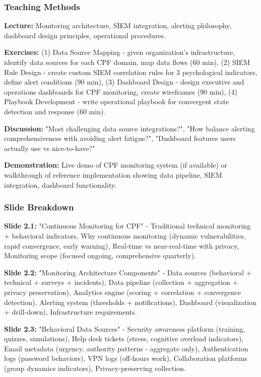 \documentclass[11pt,a4paper]{article}
\begin{document}
\subsubsection{Teaching Methods}

\textbf{Lecture:} Monitoring architecture, SIEM integration, alerting philosophy, dashboard design principles, operational procedures.

\textbf{Exercises:} (1) Data Source Mapping - given organization's infrastructure, identify data sources for each CPF domain, map data flows (60 min), (2) SIEM Rule Design - create custom SIEM correlation rules for 3 psychological indicators, define alert conditions (90 min), (3) Dashboard Design - design executive and operations dashboards for CPF monitoring, create wireframes (90 min), (4) Playbook Development - write operational playbook for convergent state detection and response (60 min).

\textbf{Discussion:} "Most challenging data source integrations?", "How balance alerting comprehensiveness with avoiding alert fatigue?", "Dashboard features users actually use vs nice-to-have?"

\textbf{Demonstration:} Live demo of CPF monitoring system (if available) or walkthrough of reference implementation showing data pipeline, SIEM integration, dashboard functionality.

\subsubsection{Slide Breakdown}

\textbf{Slide 2.1:} "Continuous Monitoring for CPF" - Traditional technical monitoring + behavioral indicators, Why continuous monitoring (dynamic vulnerabilities, rapid convergence, early warning), Real-time vs near-real-time with privacy, Monitoring scope (focused ongoing, comprehensive quarterly).

\textbf{Slide 2.2:} "Monitoring Architecture Components" - Data sources (behavioral + technical + surveys + incidents), Data pipeline (collection + aggregation + privacy preservation), Analytics engine (scoring + correlation + convergence detection), Alerting system (thresholds + notifications), Dashboard (visualization + drill-down), Infrastructure requirements.

\textbf{Slide 2.3:} "Behavioral Data Sources" - Security awareness platform (training, quizzes, simulations), Help desk tickets (stress, cognitive overload indicators), Email metadata (urgency, authority patterns - aggregate only), Authentication logs (password behaviors), VPN logs (off-hours work), Collaboration platforms (group dynamics indicators), Privacy-preserving collection.
\end{document}
